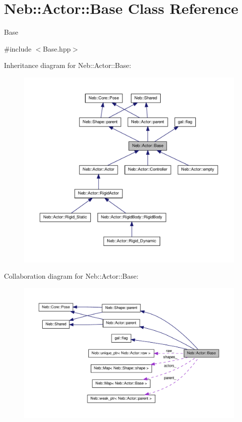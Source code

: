 \hypertarget{classNeb_1_1Actor_1_1Base}{\section{\-Neb\-:\-:\-Actor\-:\-:\-Base \-Class \-Reference}
\label{classNeb_1_1Actor_1_1Base}
}


\-Base  




{\ttfamily \#include $<$\-Base.\-hpp$>$}



\-Inheritance diagram for \-Neb\-:\-:\-Actor\-:\-:\-Base\-:
\nopagebreak
\begin{figure}[H]
\begin{center}
\leavevmode
\includegraphics[width=350pt]{classNeb_1_1Actor_1_1Base__inherit__graph}
\end{center}
\end{figure}


\-Collaboration diagram for \-Neb\-:\-:\-Actor\-:\-:\-Base\-:
\nopagebreak
\begin{figure}[H]
\begin{center}
\leavevmode
\includegraphics[width=350pt]{classNeb_1_1Actor_1_1Base__coll__graph}
\end{center}
\end{figure}
